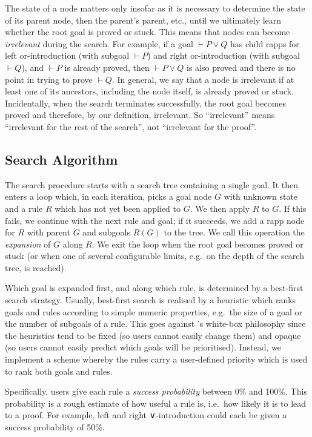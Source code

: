 The state of a node matters only insofar as it is necessary to determine the
state of its parent node, then the parent's parent, etc., until we ultimately
learn whether the root goal is proved or stuck. This means that nodes can become
\emph{irrelevant} during the search. For example, if a goal $⊢ P ∨ Q$ has child
rapps for left or-introduction (with subgoal $⊢ P$) and right or-introduction
(with subgoal $⊢ Q$), and $⊢ P$ is already proved, then $⊢ P ∨ Q$ is also proved
and there is no point in trying to prove $⊢ Q$. In general, we say that a node
is irrelevant if at least one of its ancestors, including the node itself, is
already proved or stuck. Incidentally, when the search terminates successfully,
the root goal becomes proved and therefore, by our definition, irrelevant. So
\enquote{irrelevant} means \enquote{irrelevant for the rest of the search}, not
\enquote{irrelevant for the proof}.


\subsection{Search Algorithm}%
\label{sec:search}

The search procedure starts with a search tree containing a single goal. It then
enters a loop which, in each iteration, picks a goal node $G$ with unknown state
and a rule $R$ which has not yet been applied to $G$. We then apply $R$ to $G$.
If this fails, we continue with the next rule and goal; if it succeeds, we add a
rapp node for $R$ with parent $G$ and subgoals $R(G)$ to the tree. We call this
operation the \emph{expansion} of $G$ along $R$. We exit the loop when the root
goal becomes proved or stuck (or when one of several configurable limits, e.g.\
on the depth of the search tree, is reached).

Which goal is expanded first, and along which rule, is determined by a
best-first search strategy. Usually, best-first search is realised by a
heuristic which ranks goals and rules according to simple numeric properties,
e.g.\ the size of a goal or the number of subgoals of a rule. This goes against
\Aesop's white-box philosophy since the heuristics tend to be fixed (so users
cannot easily change them) and opaque (so users cannot easily predict which
goals will be prioritised). Instead, we implement a scheme whereby the rules
carry a user-defined priority which is used to rank both goals and rules.

Specifically, \Aesop{} users give each rule a \emph{success probability} between
0\% and 100\%. This probability is a rough estimate of how useful a rule is,
i.e.\ how likely it is to lead to a proof. For example, left and right
∨-introduction could each be given a success probability of 50\%.

